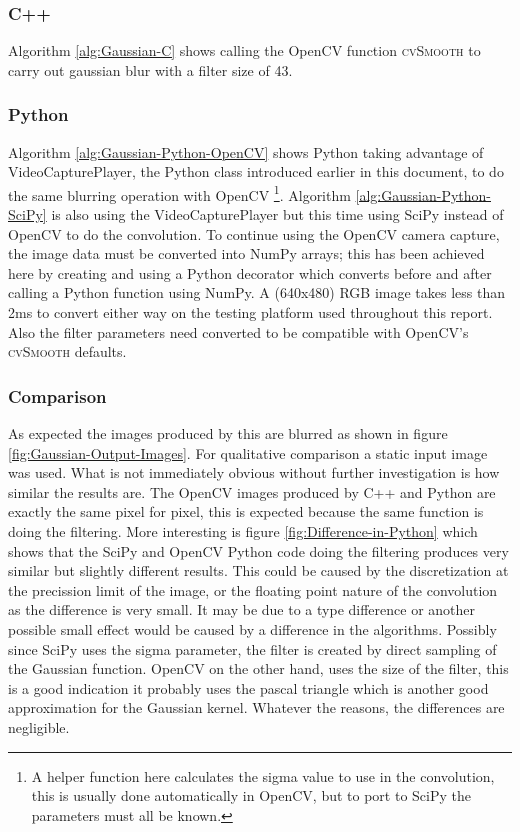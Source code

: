 \documentclass[english]{IEEEtran}
\newcommand{\noun}[1]{\textsc{#1}}
\theoremstyle{plain}
\begin{document}
\subsubsection{C++}

Algorithm \ref{alg:Gaussian-C} shows calling the OpenCV function
\noun{cvSmooth} to carry out gaussian blur with a filter size of 43. 


\subsubsection{Python}

Algorithm \ref{alg:Gaussian-Python-OpenCV} shows Python taking advantage
of VideoCapturePlayer, the Python class introduced earlier in this
document, to do the same blurring operation with OpenCV%
\footnote{A helper function here calculates the sigma value to use in the convolution,
this is usually done automatically in OpenCV, but to port to SciPy
the parameters must all be known.%
}. Algorithm \ref{alg:Gaussian-Python-SciPy} is also using the VideoCapturePlayer
but this time using SciPy instead of OpenCV to do the convolution.
To continue using the OpenCV camera capture, the image data must be
converted into NumPy arrays; this has been achieved here by creating
and using a Python decorator which converts before and after calling
a Python function using NumPy. A (640x480) RGB image takes less than
2ms to convert either way on the testing platform used throughout
this report. Also the filter parameters need converted to be compatible
with OpenCV's \noun{cvSmooth} defaults\cite{bradski2008learning}.


\subsubsection{Comparison}

As expected the images produced by this are blurred as shown in figure
\ref{fig:Gaussian-Output-Images}. For qualitative comparison a static
input image was used. What is not immediately obvious without further
investigation is how similar the results are. The OpenCV images produced
by C++ and Python are exactly the same pixel for pixel, this is expected
because the same function is doing the filtering. More interesting
is figure \ref{fig:Difference-in-Python} which shows that the SciPy
and OpenCV Python code doing the filtering produces very similar but
slightly different results. This could be caused by the discretization
at the precission limit of the image, or the floating point nature
of the convolution as the difference is very small. It may be due
to a type difference or another possible small effect would be caused
by a difference in the algorithms. Possibly since SciPy uses the sigma
parameter, the filter is created by direct sampling of the Gaussian
function. OpenCV on the other hand, uses the size of the filter, this
is a good indication it probably uses the pascal triangle which is
another good approximation for the Gaussian kernel\cite{ben1991image}.
Whatever the reasons, the differences are negligible.
\end{document}
